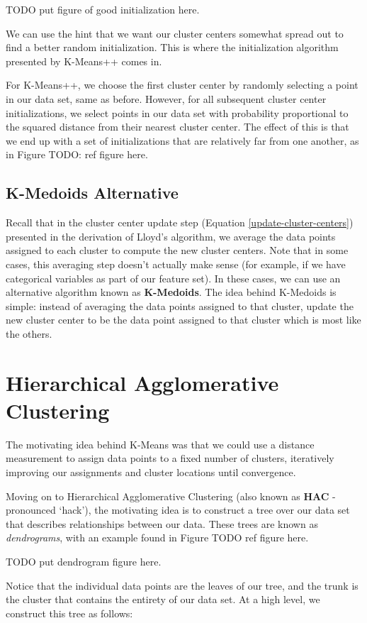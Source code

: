 TODO put figure of good initialization here.

We can use the hint that we want our cluster centers somewhat spread out to find a better random initialization. This is where the initialization algorithm presented by K-Means++ comes in.

For K-Means++, we choose the first cluster center by randomly selecting a point in our data set, same as before. However, for all subsequent cluster center initializations, we select points in our data set with probability proportional to the squared distance from their nearest cluster center. The effect of this is that we end up with a set of initializations that are relatively far from one another, as in Figure TODO: ref figure here.

\subsection{K-Medoids Alternative}
Recall that in the cluster center update step (Equation \ref{update-cluster-centers}) presented in the derivation of Lloyd's algorithm, we average the data points assigned to each cluster to compute the new cluster centers. Note that in some cases, this averaging step doesn't actually make sense (for example, if we have categorical variables as part of our feature set). In these cases, we can use an alternative algorithm known as \textbf{K-Medoids}. The idea behind K-Medoids is simple: instead of averaging the data points assigned to that cluster, update the new cluster center to be the data point assigned to that cluster which is most like the others.

\section{Hierarchical Agglomerative Clustering}
The motivating idea behind K-Means was that we could use a distance measurement to assign data points to a fixed number of clusters, iteratively improving our assignments and cluster locations until convergence.

Moving on to Hierarchical Agglomerative Clustering (also known as \textbf{HAC} - pronounced `hack'), the motivating idea is to construct a tree over our data set that describes relationships between our data. These trees are known as \textit{dendrograms}, with an example found in Figure TODO ref figure here.

TODO put dendrogram figure here.

Notice that the individual data points are the leaves of our tree, and the trunk is the cluster that contains the entirety of our data set. At a high level, we construct this tree as follows:

